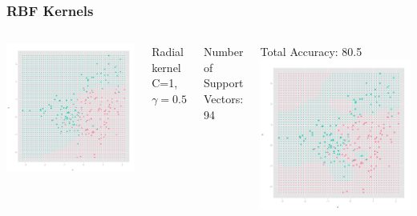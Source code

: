 \documentclass{beamer}
\begin{document}
\begin{frame}
\frametitle{RBF Kernels}
\begin{columns}[c] %
		\includegraphics{raddef.png}
		
		Radial kernel C=1, $\gamma = 0.5$

		Number of Support Vectors:  94

		Total Accuracy: 80.5 
		\includegraphics{radbs.png}
		

\end{columns}
\end{frame}
\end{document}
